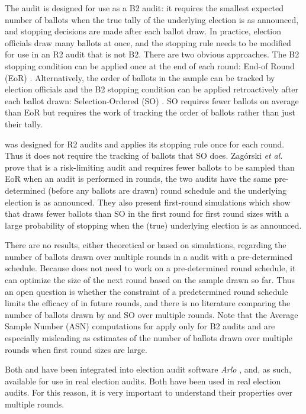 The \BRAVO audit is designed for use as a B2 audit: it requires the smallest expected number of ballots when the true tally of the underlying election is as announced, and stopping decisions are made after each ballot draw. In practice, election officials draw many ballots at once, and the \BRAVO stopping rule needs to be modified for use in an R2 audit that is not B2. There are two obvious approaches. The B2 stopping condition can be applied once at the end of each round: End-of Round (EoR) \BRAVO.  Alternatively, the order of ballots in the sample can be tracked by election officials and the B2 \BRAVO stopping condition can be applied retroactively after each ballot drawn: Selection-Ordered (SO) \BRAVO. SO \BRAVO requires fewer ballots on average than EoR \BRAVO but requires the work of tracking the order of ballots rather than just their tally. 

\Minerva was designed for R2 audits and applies its stopping rule once for each round. Thus it does not require the tracking of ballots that SO \BRAVO does. Zag{\'o}rski {\em et al.} \cite{usenix_minerva} prove that \Minerva is a risk-limiting audit and requires fewer ballots to be sampled than EoR \BRAVO when an audit is performed in rounds, the two audits have the same pre-determined (before any ballots are drawn) round schedule and the underlying election is as announced. They also present first-round simulations which show that \Minerva draws fewer ballots than SO \BRAVO in the first round for first round sizes with a large probability of stopping when the (true) underlying election is as announced. 

There are no results, either theoretical or based on simulations, regarding the number of ballots drawn over multiple rounds in a \Minerva audit with a pre-determined schedule. Because \BRAVO does not need to work on a pre-determined round schedule, it can optimize the size of the next round based on the sample drawn so far. Thus an open question is whether the constraint of a predetermined round schedule limits the efficacy of \Minerva in future rounds, and there is no literature comparing the number of ballots drawn by \Minerva and SO \BRAVO over multiple rounds. Note that the Average Sample Number (ASN) computations for \BRAVO \cite{bravo} apply only for B2 audits and are especially misleading as estimates of the number of ballots drawn over multiple rounds when first round sizes are large. 

Both \BRAVO and \Minerva have been integrated into election audit software {\em Arlo} \cite{arlo}, and, as such, available for use in real election audits. Both have been used in real election audits. For this reason, it is very important to understand their properties over multiple rounds. 

